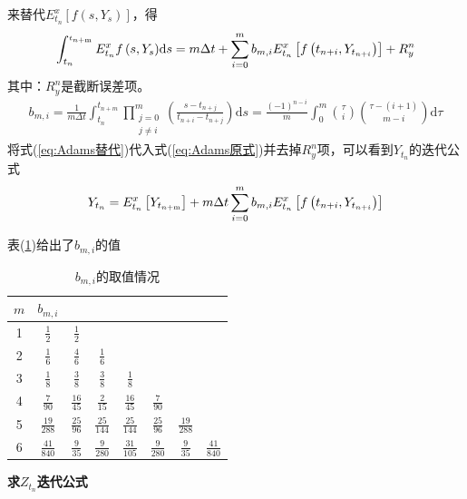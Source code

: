 			来替代$E_{t_n}^x[f(s,Y_s)]$，得
					\begin{align}\label{eq:Adams替代}
						\int_{{t_n}}^{_{{t_{n{\rm{ + m}}}}}} {E_{{t_n}}^xf\left( {s,{Y_s}} \right)} \mathrm{d}s = m\Delta t + \sum\limits_{i = 0}^m {{b_{m,i}}} E_{{t_n}}^x\left[ {f\left( {{t_{n + i}},{Y_{{t_{n + i}}}}} \right)} \right] + R_y^n
					\end{align}
			其中：$ R_y^n$是截断误差项。
			\begin{align*}
			b_{m,i} = \frac{1}{m\Delta t} \int_{t_n}^{t_{n + m}}\prod_{\substack{j = 0 \\ j\neq i}} ^m  \left( \frac{s-t_{n+j}}{t_{n + i} - t_{n + j}} \right) \mathrm{d}s = \frac{(-1)^{n-i}}{m}\int_0^m \binom{\tau}{i} \binom{\tau - (i+1)}{m-i} \mathrm{d}\tau
			\end{align*}
			将式(\ref{eq:Adams替代})代入式(\ref{eq:Adams原式})并去掉$R_y^n$项，可以看到$Y_{t_n}$的迭代公式
			\begin{align*}
			Y_{t_n} = E_{t_n}^x\left[Y_{t_{n{\rm{ + m}}}}\right] + m\Delta t\sum\limits_{i = 0}^m b_{m,i}E_{t_n}^x\left[f\left(t_{n+i},Y_{t_{n + i}}\right)\right]
			\end{align*}
			\par
			表(\ref{tab:bmi的取值情况})给出了$b_{m,i}$的值
			\begin{table}[H]
			\centering
			\caption{$b_{m,i}$的取值情况}
			\label{tab:bmi的取值情况}
			\begin{tabular}{c|ccccccc}
			     $m$ & $b_{m,i}$\\
			\hline
			1 & $\frac 12$ & $\frac 12$ & {} & {} & {} & {} & {}\\
			2 & $\frac 16$ & $\frac 46$ & $\frac 16$ & {} & {} & {} & {}\\
			3 & $\frac 18$ & $\frac 38$ & $\frac 38$ & $\frac 18$ & {} & {} & {}\\
			4 & $\frac {7}{90}$ & $\frac {16}{45}$ & $\frac {2}{15}$ & $\frac {16}{45}$ & $\frac {7}{90}$ & {} & {}\\
			5 & $\frac {19}{288}$ & $\frac {25}{96}$ & $\frac {25}{144}$ & $\frac {25}{144}$ & $\frac {25}{96}$ & $\frac {19}{288}$ & {}\\
			6 & $\frac {41}{840}$ & $\frac {9}{35}$ & $\frac {9}{280}$ & $\frac {31}{105}$ & $\frac {9}{280}$ & $\frac {9}{35}$ & $\frac {41}{840}$\\
			\end{tabular}
			\end{table}
			\checkmark \textbf{求$Z_{t_n}$迭代公式}
			\par
